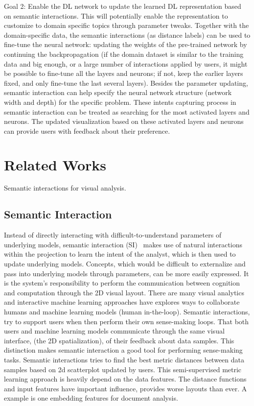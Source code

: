 \documentclass[manuscript,screen]{acmart}
\begin{document}
Goal 2:  Enable the DL network to update the learned DL representation based on semantic interactions.  This will potentially enable the representation to customize to domain specific topics through parameter tweaks.  
Together with the domain-specific data, the semantic interactions (as distance labels) can be used to fine-tune the neural network: updating the weights of the pre-trained network by continuing the backpropagation (if the domain dataset is similar to the training data and big enough, or a large number of interactions applied by users, it might be possible to fine-tune all the layers and neurons; if not,  keep the earlier layers fixed, and only fine-tune the last several layers). 
Besides the parameter updating, semantic interaction can help specify the neural network structure (network width and depth) for the specific problem. These intents capturing process in semantic interaction can be treated as searching for the most activated layers and neurons. The updated visualization based on these activated layers and neurons can provide users with feedback about their preference.


\section{Related Works}
Semantic interactions for visual analysis. 

\subsection{Semantic Interaction}
\label{sec-VA}

Instead of directly interacting with difficult-to-understand parameters of underlying models, semantic interaction (SI)~\cite{Endert:he} makes use of natural interactions within the projection to learn the intent of the analyst, which is then used to update underlying models.
Concepts, which would be difficult to externalize and pass into underlying models through parameters, can be more easily expressed.
It is the system's responsibility to perform the communication between cognition and computation through the 2D visual layout.
There are many visual analytics and interactive machine learning approaches have explores ways to collaborate humans and machine learning models (human in-the-loop). 
Semantic interactions, try to support users when then perform their own sense-making loops. 
That both users and machine learning models communicate through the same visual interface, (the 2D spatialization), of their feedback about data samples. 
This distinction makes semantic interaction a good tool for performing sense-making tasks. 
Semantic interactions tries to find the best metric distances between data samples based on 2d scatterplot updated by users.
This semi-supervised metric learning approach is heavily depend on the data features. 
The distance functions and input features have important influence, provides worse layouts than ever. 
A example is one embedding features for document analysis. 
\end{document}
